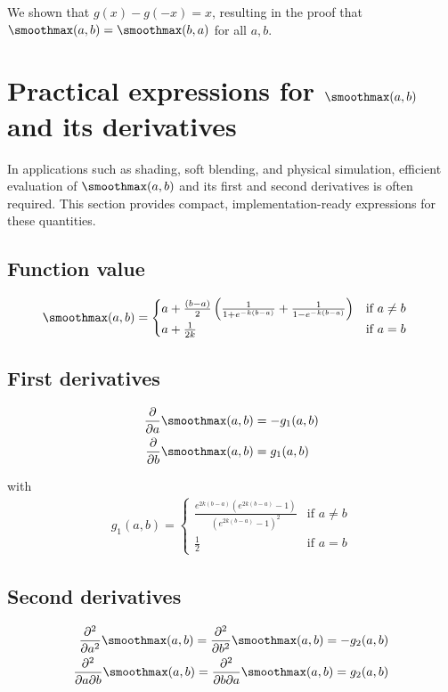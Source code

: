 We shown that $g(x) - g(-x) = x$, resulting in the proof that $\smoothmax(a, b) = \smoothmax(b, a)$ for all $a, b$.

\section{Practical expressions for $\smoothmax(a, b)$ and its derivatives}
\label{sec:smoothmax-practical-forms}

In applications such as shading, soft blending, and physical simulation, efficient evaluation of $\smoothmax(a, b)$ and its first and second derivatives is often required. This section provides compact, implementation-ready expressions for these quantities.

\subsection*{Function value}
\begin{align}
    \smoothmax(a, b) &= \begin{cases}
        a + \frac{(b - a)}{2} \left( \frac{1}{1 + e^{-k(b-a)}} + \frac{1}{1 - e^{-k(b-a)}} \right) &\text{if } a \neq b \\
        a + \frac{1}{2k} &\text{if } a = b
    \end{cases}
\end{align}

\subsection*{First derivatives}
\begin{align}
    \frac{\partial}{\partial a} \smoothmax(a, b) &= - g_1(a, b) \\
    \frac{\partial}{\partial b} \smoothmax(a, b) &= g_1(a, b)
\end{align}

with 
\begin{align}
    g_1(a, b) = \begin{cases}
        \frac{e^{2k(b-a)}\left(e^{2k(b-a)} - 1\right)}{\left(e^{2k(b-a)}-1\right)^2} &\text{if } a \neq b \\
        \frac{1}{2} &\text{if } a = b
    \end{cases}
\end{align}

\subsection*{Second derivatives}
\begin{align}
    \frac{\partial^2}{\partial a^2} \smoothmax(a, b) = \frac{\partial^2}{\partial b^2} \smoothmax(a, b) = - g_2(a, b) \\
    \frac{\partial^2}{\partial a \partial b} \smoothmax(a, b) = \frac{\partial^2}{\partial b \partial a} \smoothmax(a, b) = g_2(a, b)
\end{align}


